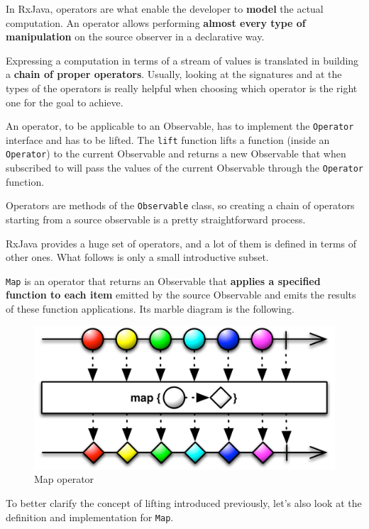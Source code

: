 In RxJava, operators are what enable the developer to \textbf{model} the
actual computation. An operator allows performing \textbf{almost every
type of manipulation} on the source observer in a declarative way.

Expressing a computation in terms of a stream of values is translated in
building a \textbf{chain of proper operators}. Usually, looking at the
signatures and at the types of the operators is really helpful when
choosing which operator is the right one for the goal to achieve.

An operator, to be applicable to an Observable, has to implement the
\texttt{Operator} interface and has to be lifted. The \texttt{lift}
function lifts a function (inside an \texttt{Operator}) to the current
Observable and returns a new Observable that when subscribed to will
pass the values of the current Observable through the \texttt{Operator}
function.

Operators are methods of the \texttt{Observable} class, so creating a
chain of operators starting from a source observable is a pretty
straightforward process.

RxJava provides a huge set of operators, and a lot of them is defined
in terms of other ones. What follows is only a small introductive
subset.

\label{map}

\texttt{Map} is an operator that returns an Observable that
\textbf{applies a specified function to each item} emitted by the source
Observable and emits the results of these function applications. Its
marble diagram is the following.

\begin{figure}[htbp]
\centering
\includegraphics[scale=0.5]{imgs/map.png}
\caption{Map operator}
\end{figure}

To better clarify the concept of lifting introduced previously, let's
also look at the definition and implementation for \texttt{Map}.

